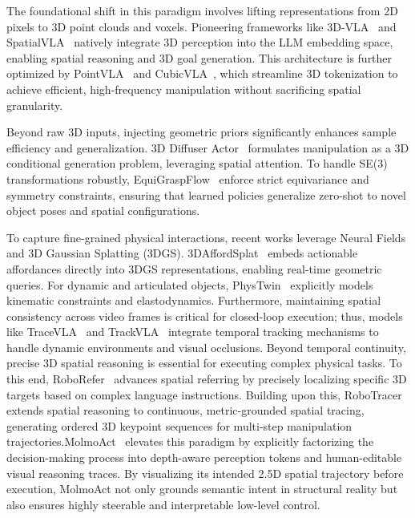 \documentclass[acmsmall,screen,review,anonymous]{acmart}
\begin{document}
The foundational shift in this paradigm involves lifting representations from 2D pixels to 3D point clouds and voxels. Pioneering frameworks like 3D-VLA~\cite{zhen20243dvla} and SpatialVLA~\cite{qu2025spatialvla} natively integrate 3D perception into the LLM embedding space, enabling spatial reasoning and 3D goal generation. This architecture is further optimized by PointVLA~\cite{li2026pointvla} and CubicVLA~\cite{ji2026cubicvla}, which streamline 3D tokenization to achieve efficient, high-frequency manipulation without sacrificing spatial granularity.

Beyond raw 3D inputs, injecting geometric priors significantly enhances sample efficiency and generalization. 3D Diffuser Actor~\cite{3ddiffuseractor2024} formulates manipulation as a 3D conditional generation problem, leveraging spatial attention. To handle SE(3) transformations robustly, EquiGraspFlow~\cite{lim2024equigraspflow} enforce strict equivariance and symmetry constraints, ensuring that learned policies generalize zero-shot to novel object poses and spatial configurations.

To capture fine-grained physical interactions, recent works leverage Neural Fields and 3D Gaussian Splatting (3DGS). 3DAffordSplat~\cite{wei20253daffordsplat} embeds actionable affordances directly into 3DGS representations, enabling real-time geometric queries. For dynamic and articulated objects, PhysTwin~\cite{jiang2025phystwin} explicitly models kinematic constraints and elastodynamics. Furthermore, maintaining spatial consistency across video frames is critical for closed-loop execution; thus, models like TraceVLA~\cite{zheng2025tracevla} and TrackVLA~\cite{wang2025trackvla} integrate temporal tracking mechanisms to handle dynamic environments and visual occlusions. Beyond temporal continuity, precise 3D spatial reasoning is essential for executing complex physical tasks. To this end, RoboRefer~\cite{zhou2025roborefer} advances spatial referring by precisely localizing specific 3D targets based on complex language instructions. Building upon this, RoboTracer~\cite{zhou2025robotracer} extends spatial reasoning to continuous, metric-grounded spatial tracing, generating ordered 3D keypoint sequences for multi-step manipulation trajectories.MolmoAct~\cite{lee2025molmoact} elevates this paradigm by explicitly factorizing the decision-making process into depth-aware perception tokens and human-editable visual reasoning traces. By visualizing its intended 2.5D spatial trajectory before execution, MolmoAct not only grounds semantic intent in structural reality but also ensures highly steerable and interpretable low-level control.
\end{document}
